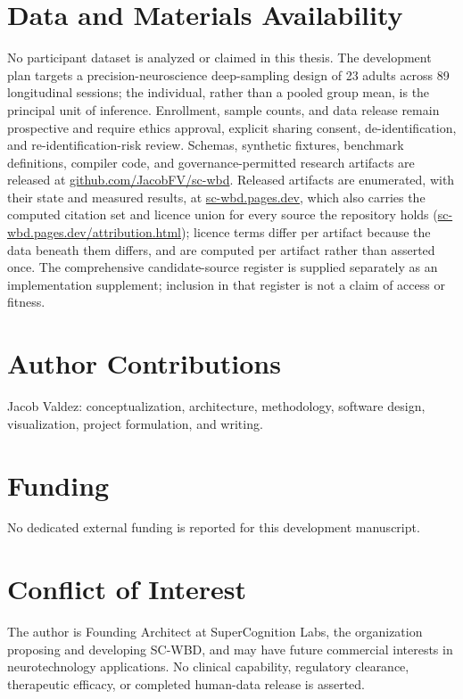 \documentclass[10pt,a4paper]{article}
\begin{document}
{\section{Data and Materials Availability}
No participant dataset is analyzed or claimed in this thesis. The development plan targets a precision-neuroscience deep-sampling design of 23 adults across 89 longitudinal sessions; the individual, rather than a pooled group mean, is the principal unit of inference. Enrollment, sample counts, and data release remain prospective and require ethics approval, explicit sharing consent, de-identification, and re-identification-risk review. Schemas, synthetic fixtures, benchmark definitions, compiler code, and governance-permitted research artifacts are released at \href{https://github.com/JacobFV/sc-wbd}{github.com/JacobFV/sc-wbd}. Released artifacts are enumerated, with their state and measured results, at \href{https://sc-wbd.pages.dev}{sc-wbd.pages.dev}, which also carries the computed citation set and licence union for every source the repository holds (\href{https://sc-wbd.pages.dev/attribution.html}{sc-wbd.pages.dev/attribution.html}); licence terms differ per artifact because the data beneath them differs, and are computed per artifact rather than asserted once. The comprehensive candidate-source register is supplied separately as an implementation supplement; inclusion in that register is not a claim of access or fitness.

\section{Author Contributions}
Jacob Valdez: conceptualization, architecture, methodology, software design, visualization, project formulation, and writing.

\section{Funding}
No dedicated external funding is reported for this development manuscript.

\section{Conflict of Interest}
The author is Founding Architect at SuperCognition Labs, the organization proposing and developing SC-WBD, and may have future commercial interests in neurotechnology applications. No clinical capability, regulatory clearance, therapeutic efficacy, or completed human-data release is asserted.

}
\end{document}
